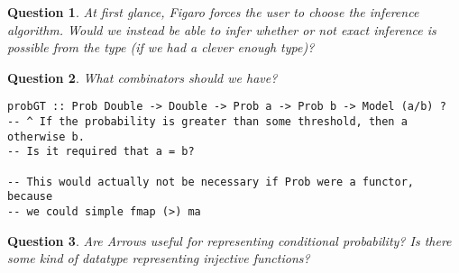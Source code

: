 \documentclass{article}
\theoremstyle{definition}
\newtheorem{qst}{Question}
\begin{document}
\begin{qst}
    \emph{At first glance, Figaro forces the user to choose the
    inference algorithm. Would we instead be able to infer
    whether or not exact inference is possible from the type
    (if we had a clever enough type)?}
\end{qst}

\begin{qst}
    \emph{What combinators should we have?}

    \begin{lstlisting}
probGT :: Prob Double -> Double -> Prob a -> Prob b -> Model (a/b) ?
-- ^ If the probability is greater than some threshold, then a otherwise b.
-- Is it required that a = b?

-- This would actually not be necessary if Prob were a functor, because
-- we could simple fmap (>) ma
    \end{lstlisting}
\end{qst}

\begin{qst}
    \emph{Are Arrows useful for representing conditional probability?
    Is there some kind of datatype representing injective functions?}
\end{qst}
\end{document}
